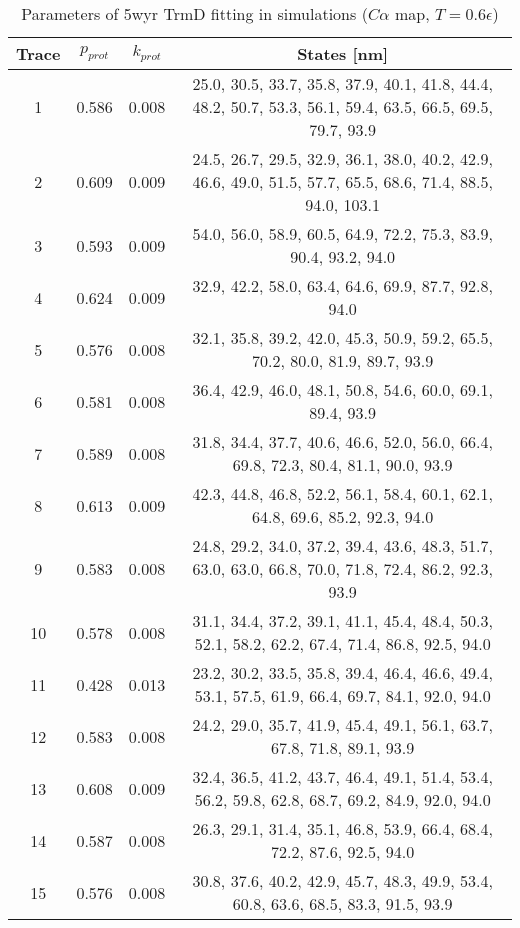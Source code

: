\begin{table}
    \tiny
    \centering
    \caption{Parameters of 5wyr TrmD fitting in simulations ($C\alpha$ map, $T=0.6\epsilon$)}
    \label{tab:5wyr-cb-parameters}
    \begin{tabular}{c|c|c|c}
        \textbf{Trace} & \textbf{$p_{prot}$} & \textbf{$k_{prot}$} & \textbf{States [nm]}\\\hline
        1 & 0.586 & 0.008 & 25.0, 30.5, 33.7, 35.8, 37.9, 40.1, 41.8, 44.4, 48.2, 50.7, 53.3, 56.1, 59.4, 63.5, 66.5, 69.5, 79.7, 93.9\\
        2 & 0.609 & 0.009 & 24.5, 26.7, 29.5, 32.9, 36.1, 38.0, 40.2, 42.9, 46.6, 49.0, 51.5, 57.7, 65.5, 68.6, 71.4, 88.5, 94.0, 103.1\\
        3 & 0.593 & 0.009 & 54.0, 56.0, 58.9, 60.5, 64.9, 72.2, 75.3, 83.9, 90.4, 93.2, 94.0\\
        4 & 0.624 & 0.009 & 32.9, 42.2, 58.0, 63.4, 64.6, 69.9, 87.7, 92.8, 94.0\\
        5 & 0.576 & 0.008 & 32.1, 35.8, 39.2, 42.0, 45.3, 50.9, 59.2, 65.5, 70.2, 80.0, 81.9, 89.7, 93.9\\
        6 & 0.581 & 0.008 & 36.4, 42.9, 46.0, 48.1, 50.8, 54.6, 60.0, 69.1, 89.4, 93.9\\
        7 & 0.589 & 0.008 & 31.8, 34.4, 37.7, 40.6, 46.6, 52.0, 56.0, 66.4, 69.8, 72.3, 80.4, 81.1, 90.0, 93.9\\
        8 & 0.613 & 0.009 & 42.3, 44.8, 46.8, 52.2, 56.1, 58.4, 60.1, 62.1, 64.8, 69.6, 85.2, 92.3, 94.0\\
        9 & 0.583 & 0.008 & 24.8, 29.2, 34.0, 37.2, 39.4, 43.6, 48.3, 51.7, 63.0, 63.0, 66.8, 70.0, 71.8, 72.4, 86.2, 92.3, 93.9\\
        10 & 0.578 & 0.008 & 31.1, 34.4, 37.2, 39.1, 41.1, 45.4, 48.4, 50.3, 52.1, 58.2, 62.2, 67.4, 71.4, 86.8, 92.5, 94.0\\
        11 & 0.428 & 0.013 & 23.2, 30.2, 33.5, 35.8, 39.4, 46.4, 46.6, 49.4, 53.1, 57.5, 61.9, 66.4, 69.7, 84.1, 92.0, 94.0\\
        12 & 0.583 & 0.008 & 24.2, 29.0, 35.7, 41.9, 45.4, 49.1, 56.1, 63.7, 67.8, 71.8, 89.1, 93.9\\
        13 & 0.608 & 0.009 & 32.4, 36.5, 41.2, 43.7, 46.4, 49.1, 51.4, 53.4, 56.2, 59.8, 62.8, 68.7, 69.2, 84.9, 92.0, 94.0\\
        14 & 0.587 & 0.008 & 26.3, 29.1, 31.4, 35.1, 46.8, 53.9, 66.4, 68.4, 72.2, 87.6, 92.5, 94.0\\
        15 & 0.576 & 0.008 & 30.8, 37.6, 40.2, 42.9, 45.7, 48.3, 49.9, 53.4, 60.8, 63.6, 68.5, 83.3, 91.5, 93.9\\
    \end{tabular}
\end{table}

